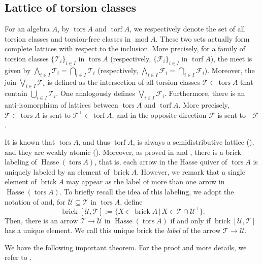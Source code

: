 \documentclass{amsart}
\theoremstyle{thmstyle}
\theoremstyle{exstyle}
\theoremstyle{defstyle}
\theoremstyle{remstyle}
\theoremstyle{remstyle}
\DeclareMathOperator*{\modu}{mod}
\DeclareMathOperator*{\brick}{brick}
\DeclareMathOperator*{\tors}{tors}
\DeclareMathOperator*{\torf}{torf}
\DeclareMathOperator*{\Hasse}{Hasse}
\begin{document}
\subsection{Lattice of torsion classes}
For an algebra $A$, by $\tors A$ and $\torf A$, we respectively denote the set of all torsion classes and torsion-free classes in $\modu A$. These two sets actually form complete lattices with respect to the inclusion. More precisely, for a family of torsion classes $\{\mathcal{T}_i\}_{i \in I}$ in $ \tors A$ (respectively, $\{\mathcal{F}_i\}_{i \in I}$ in $\torf A$), the meet is given by $\bigwedge_{i\in I}\mathcal{T}_i = \bigcap_{i \in I}\mathcal{T}_i$ (respectively, $\bigwedge_{i\in I}\mathcal{F}_i = \bigcap_{i \in I}\mathcal{F}_i$). Moreover, the join $\bigvee_{i\in I}\mathcal{T}_i$ is defined as the intersection of all torsion classes $\mathcal{T}\in \tors A$ that contain $\bigcup_{i\in I}\mathcal{T}_i$. One analogously defines $\bigvee_{i\in I}\mathcal{F}_i$.
Furthermore, there is an anti-isomorphism of lattices between $\tors A$ and $\torf A$. More precisely, $\mathcal{T}\in \tors A$ is sent to $\mathcal{T}^{\bot} \in \torf A$, and in the opposite direction $\mathcal{F}$ is sent to $^{\bot}\mathcal{F}$. 

It is known that $\tors A$, and thus $\torf A$, is always a semidistributive lattice (\cite[Theorem 4.5]{GM}), and they are weakly atomic (\cite[Theorem 3.1]{DI+}).
Moreover, as proved in \cite{BCZ} and \cite{DI+}, there is a brick labeling of $\Hasse(\tors A)$, that is, each arrow in the Hasse quiver of $\tors A$ is uniquely labeled by an element of $\brick A$. However, we remark that a single element of $\brick A$ may appear as the label of more than one arrow in $\Hasse(\tors A)$. 
To briefly recall the idea of this labeling, we adopt the notation of \cite{DI+} and, for $\mathcal{U} \subseteq \mathcal{T}$ in $\tors A$, define 
$$\brick[\mathcal{U},\mathcal{T}]:=\{X\in \brick A \,|\, X \in \mathcal{T} \cap \mathcal{U}^{\bot}\}.$$
Then, there is an arrow $\mathcal{T} \rightarrow \mathcal{U}$ in $\Hasse(\tors A)$ if and only if $\brick[\mathcal{U},\mathcal{T}]$ has a unique element. We call this unique brick the \emph{label} of the arrow $\mathcal{T} \rightarrow \mathcal{U}$. 

We have the following important theorem. For the proof and more details, we refer to \cite[Section 3.2]{DI+}. 
\end{document}
